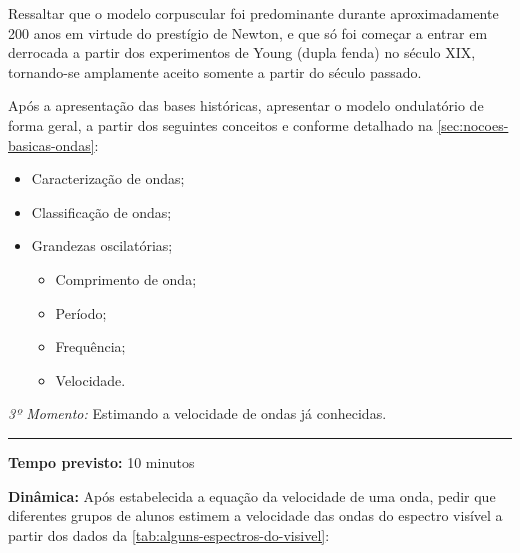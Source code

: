    Ressaltar que o modelo corpuscular foi predominante durante aproximadamente 200 anos em virtude do prestígio de Newton, e que só foi começar a entrar em derrocada a partir dos experimentos de Young (dupla fenda) no século XIX, tornando-se amplamente aceito somente a partir do século passado.

    Após a apresentação das bases históricas, apresentar o modelo ondulatório de forma geral, a partir dos seguintes conceitos e conforme detalhado na \autoref{sec:nocoes-basicas-ondas}:

    \begin{itemize}
        \item Caracterização de ondas;
        \item Classificação de ondas;
        \item Grandezas oscilatórias;
        \begin{itemize}
            \item Comprimento de onda;
            \item Período;
            \item Frequência;
            \item Velocidade.
        \end{itemize}
    \end{itemize}   
    

	\vspace{50pt}
    \noindent \emph{3º Momento:} Estimando a velocidade de ondas já conhecidas.
	\par\noindent\rule{.3\textwidth}{.5pt}      
    \par\noindent \textbf{Tempo previsto: }10 minutos
    \par\noindent \textbf{Dinâmica:} Após estabelecida a equação da velocidade de uma onda, pedir que diferentes grupos de alunos estimem a velocidade das ondas do espectro visível a partir dos dados da \autoref{tab:alguns-espectros-do-visivel}:
    \vspace*{10pt}

